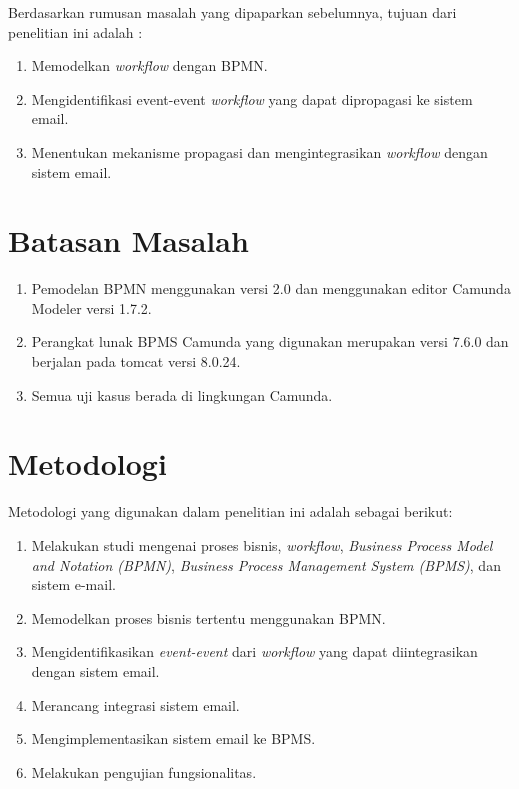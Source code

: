Berdasarkan rumusan masalah yang dipaparkan sebelumnya, tujuan dari penelitian ini adalah :
\begin{enumerate}
	\item Memodelkan \textit{workflow} dengan BPMN.
	\item Mengidentifikasi event-event \textit{workflow} yang dapat dipropagasi ke sistem email.
	\item Menentukan mekanisme propagasi dan mengintegrasikan \textit{workflow} dengan sistem email.
\end{enumerate}




\section{Batasan Masalah}
\label{sec:batasan}
\begin{enumerate}
	\item Pemodelan BPMN menggunakan versi 2.0 dan menggunakan editor Camunda Modeler versi 1.7.2.
	\item Perangkat lunak BPMS Camunda yang digunakan merupakan versi 7.6.0 dan berjalan pada tomcat versi 8.0.24.
	\item Semua uji kasus berada di lingkungan Camunda.
\end{enumerate}




\section{Metodologi}
\label{sec:metlit}

Metodologi yang digunakan dalam penelitian ini adalah sebagai berikut:
\begin{enumerate}
	\item Melakukan studi mengenai proses bisnis, \textit{workflow}, \textit{Business Process Model and Notation (BPMN)}, \textit{Business Process Management System (BPMS)}, dan sistem e-mail. 
	\item Memodelkan proses bisnis tertentu menggunakan BPMN.
	\item Mengidentifikasikan \textit{event-event} dari \textit{workflow} yang dapat diintegrasikan dengan sistem email.
	\item Merancang integrasi sistem email.
	\item Mengimplementasikan sistem email ke BPMS.
	\item Melakukan pengujian fungsionalitas.
\end{enumerate}




